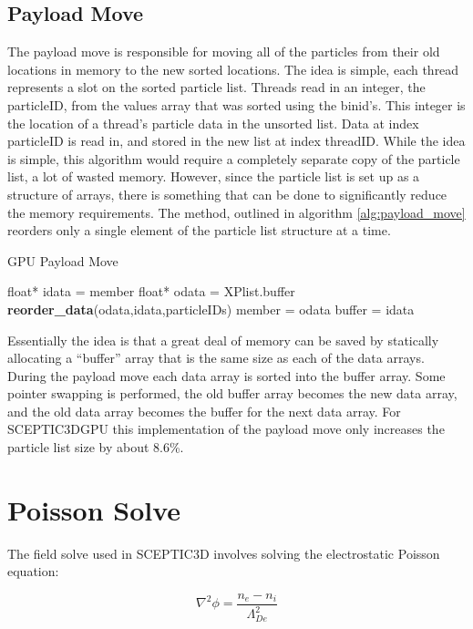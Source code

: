 		\subsection{Payload Move}
		The payload move is responsible for moving all of the particles from their old locations in memory to the new sorted locations. The idea is simple, each thread represents a slot on the sorted particle list. Threads read in an integer, the particleID, from the values array that was sorted using the binid's. This integer is the location of a thread's particle data in the unsorted list. Data at index particleID is read in, and stored in the new list at index threadID. While the idea is simple, this algorithm would require a completely separate copy of the particle list, a lot of wasted memory. However, since the particle list is set up as a structure of arrays, there is something that can be done to significantly reduce the memory requirements. The method, outlined in algorithm \ref{alg:payload_move} reorders only a single element of the particle list structure at a time. 

\begin{algorithm}
	\caption{GPU Payload Move}
	\label{alg:payload_move}
	\begin{algorithmic}
		\STATE float* idata = member
		\STATE float* odata = XPlist.buffer
		\STATE \textbf{reorder\_data}(odata,idata,particleIDs)
		\STATE member = odata
		\STATE buffer = idata
		\ENDFOR
	\end{algorithmic}
\end{algorithm}
  		
		Essentially the idea is that a great deal of memory can be saved by statically allocating a ``buffer'' array that is the same size as each of the data arrays. During the payload move each data array is sorted into the buffer array. Some pointer swapping is performed, the old buffer array becomes the new data array, and the old data array becomes the buffer for the next data array. For SCEPTIC3DGPU this implementation of the payload move only increases the particle list size by about 8.6\%.



	\section{Poisson Solve}
The field solve used in SCEPTIC3D involves solving the electrostatic Poisson equation:

\begin{equation}
\nabla^2\phi=\frac{n_e-n_i}{\Lambda_{De}^2}
\label{eqn:poisson_eqn1}
\end{equation}

